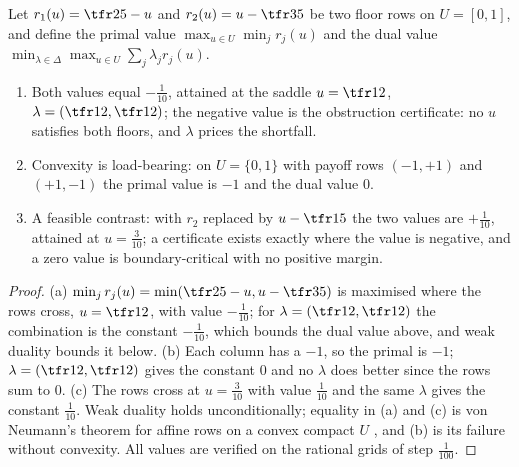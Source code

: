 \begin{proposition}\label{prop:duality}
Let $r_1(u)=\tfr25-u$ and $r_2(u)=u-\tfr35$ be two floor rows on $U=[0,1]$, and define the primal value $\max_{u\in U}\min_j r_j(u)$ and the dual value $\min_{\lambda\in\Delta}\max_{u\in U}\sum_j\lambda_j r_j(u)$.
\begin{enumerate}[label=(\alph*),leftmargin=2em,itemsep=1pt]
\item Both values equal $-\tfrac{1}{10}$, attained at the saddle $u=\tfr12$, $\lambda=(\tfr12,\tfr12)$; the negative value is the obstruction certificate: no $u$ satisfies both floors, and $\lambda$ prices the shortfall.
\item Convexity is load-bearing: on $U=\{0,1\}$ with payoff rows $(-1,+1)$ and $(+1,-1)$ the primal value is $-1$ and the dual value $0$.
\item A feasible contrast: with $r_2$ replaced by $u-\tfr15$ the two values are $+\tfrac1{10}$, attained at $u=\tfrac{3}{10}$; a certificate exists exactly where the value is negative, and a zero value is boundary-critical with no positive margin.
\end{enumerate}
\end{proposition}

\begin{proof}
(a) $\min_j r_j(u)=\min(\tfr25-u,u-\tfr35)$ is maximised where the rows cross, $u=\tfr12$, with value $-\tfrac1{10}$; for $\lambda=(\tfr12,\tfr12)$ the combination is the constant $-\tfrac1{10}$, which bounds the dual value above, and weak duality bounds it below. (b) Each column has a $-1$, so the primal is $-1$; $\lambda=(\tfr12,\tfr12)$ gives the constant $0$ and no $\lambda$ does better since the rows sum to $0$. (c) The rows cross at $u=\tfrac3{10}$ with value $\tfrac1{10}$ and the same $\lambda$ gives the constant $\tfrac1{10}$. Weak duality holds unconditionally; equality in (a) and (c) is von Neumann's theorem for affine rows on a convex compact $U$ \cite{vonNeumann1928}, and (b) is its failure without convexity. All values are verified on the rational grids of step $\tfrac1{100}$.
\end{proof}

